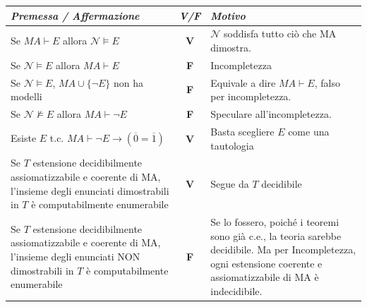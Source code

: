 \documentclass[a4paper,11pt]{report}
\begin{document}
\begin{table}[H]
\centering
\renewcommand{\arraystretch}{1.5}
\begin{tabularx}{\textwidth}{|>{\raggedright\arraybackslash}X|c|>{\raggedright\arraybackslash}p{7cm}|}
\hline
\textit{Premessa / Affermazione} & \textit{V/F} & \textit{Motivo} \\ \hline
Se $MA \vdash E$ allora $\mathcal{N} \models E$ & \textbf{V} & $\mathcal{N}$ soddisfa tutto ciò che MA dimostra. \\ \hline
Se $\mathcal{N} \models E$ allora $MA \vdash E$ & \textbf{F} & Incompletezza \\ \hline
Se $\mathcal{N} \models E$, $MA \cup \{\neg E\}$ non ha modelli & \textbf{F} & Equivale a dire $MA \vdash E$, falso per incompletezza. \\ \hline
Se $\mathcal{N} \not\models E$ allora $MA \vdash \neg E$ & \textbf{F} & Speculare all'incompletezza. \\ \hline
Esiste $E$ t.c. $MA \vdash \neg E \to (\overline{0} = \overline{1})$ & \textbf{V} & Basta scegliere $E$ come una tautologia  \\ \hline
Se $T$ estensione decidibilmente assiomatizzabile e coerente di MA, l'insieme degli enunciati dimostrabili in $T$ è computabilmente enumerabile & \textbf{V} & Segue da \( T \) decidibile \\ \hline
Se $T$ estensione decidibilmente assiomatizzabile e coerente di MA, l'insieme degli enunciati NON dimostrabili in $T$ è computabilmente enumerabile & \textbf{F} & Se lo fossero, poiché i teoremi sono già c.e., la teoria sarebbe decidibile. Ma per Incompletezza, ogni estensione coerente e assiomatizzabile di MA è indecidibile. \\ \hline
\end{tabularx}
\end{table}
\end{document}
